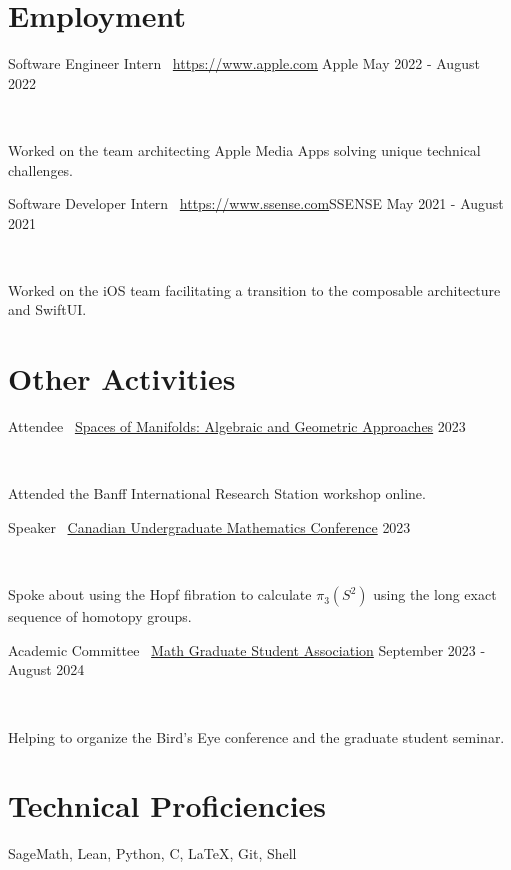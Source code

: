 \documentclass[]{style}
\begin{document}
\section{Employment}

\begin{entrylist}

\vspace{1mm}

\entry
{Software Engineer Intern \ {\normalfont \url{https://www.apple.com}{Apple}}}
{May 2022 - August 2022}
{ ~ \vspace{-2.5mm}

Worked on the team architecting Apple Media Apps solving unique technical challenges. }

\entry
{Software Developer Intern \ {\normalfont \url{https://www.ssense.com}{SSENSE}}}
{May 2021 - August 2021}
{ ~ \vspace{-2.5mm}

Worked on the iOS team facilitating a transition to the composable architecture and SwiftUI.}

\end{entrylist}

\section{Other Activities}

\begin{entrylist}

\vspace{1mm}

\entry
{Attendee \ {\normalfont \underline{Spaces of Manifolds: Algebraic and Geometric Approaches}}}
{2023}
{ ~ \vspace{-2.5mm}

Attended the Banff International Research Station workshop online.}

\entry
{Speaker \ {\normalfont \underline{Canadian Undergraduate Mathematics Conference}}}
{2023}
{ ~ \vspace{-2.5mm}

Spoke about using the Hopf fibration to calculate $\pi_3(S^2)$ using the long exact sequence of homotopy groups.}

\entry
{Academic Committee \ {\normalfont \underline{Math Graduate Student Association}}}
{September 2023 - August 2024}
{ ~ \vspace{-2.5mm}

Helping to organize the Bird's Eye conference and the graduate student seminar.}

\end{entrylist}

\section{Technical Proficiencies}

SageMath, Lean, Python, C, \LaTeX, Git, Shell
\end{document}
